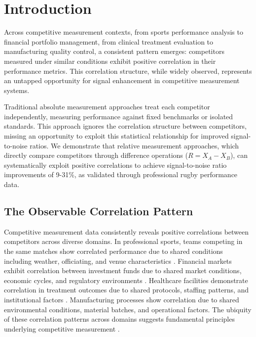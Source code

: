 \section{Introduction}

Across competitive measurement contexts, from sports performance analysis to financial portfolio management, from clinical treatment evaluation to manufacturing quality control, a consistent pattern emerges: competitors measured under similar conditions exhibit positive correlation in their performance metrics. This correlation structure, while widely observed, represents an untapped opportunity for signal enhancement in competitive measurement systems.

Traditional absolute measurement approaches treat each competitor independently, measuring performance against fixed benchmarks or isolated standards. This approach ignores the correlation structure between competitors, missing an opportunity to exploit this statistical relationship for improved signal-to-noise ratios. We demonstrate that relative measurement approaches, which directly compare competitors through difference operations ($R = X_A - X_B$), can systematically exploit positive correlations to achieve signal-to-noise ratio improvements of 9-31\%, as validated through professional rugby performance data.

\subsection{The Observable Correlation Pattern}

Competitive measurement data consistently reveals positive correlations between competitors across diverse domains. In professional sports, teams competing in the same matches show correlated performance due to shared conditions including weather, officiating, and venue characteristics \cite{bennett2019descriptive, scott2023performance, scott2023classifying}. Financial markets exhibit correlation between investment funds due to shared market conditions, economic cycles, and regulatory environments \cite{carhart1997persistence, fama1993common}. Healthcare facilities demonstrate correlation in treatment outcomes due to shared protocols, staffing patterns, and institutional factors \cite{iezzoni1997risk, normand2016statistical}. Manufacturing processes show correlation due to shared environmental conditions, material batches, and operational factors. The ubiquity of these correlation patterns across domains suggests fundamental principles underlying competitive measurement \cite{stefani2011measurement}.


